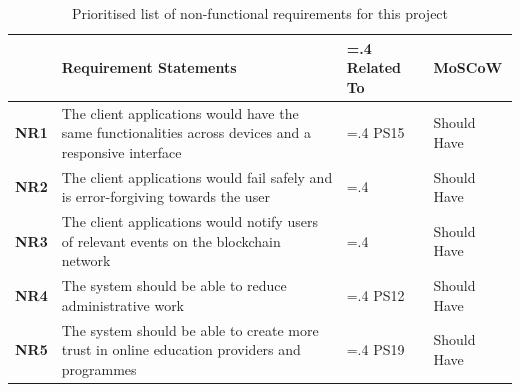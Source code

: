 \begin{table}[!h]
	\caption{Prioritised list of non-functional requirements for this project}
	\centering
	\label{table:nonfx-reqs}
	\begin{tabularx}{\textwidth}{>{\bfseries}l>{\hsize=1.6\hsize}X>{\hsize=.4\hsize}Xl}
		                       & Requirement Statements                                                          & Related To  & MoSCoW
		\\\toprule
		NR1                    & The client applications would have the same functionalities across devices and
		a responsive interface & PS15                                                                            & Should Have
		\\\midrule
		NR2                    & The client applications would fail safely and is error-forgiving
		towards the user       &                                                                                 & Should Have
		\\\midrule
		NR3                    & The client applications would notify users of relevant events on the blockchain
		network                &                                                                                 & Should Have
		\\\midrule
		NR4                    & The system should be able to reduce administrative work                         & PS12        & Should Have
		\\\midrule
		NR5                    & The system should be able to create more trust in online education providers
		and programmes         & PS19                                                                            & Should Have
		\\\bottomrule
	\end{tabularx}
\end{table}